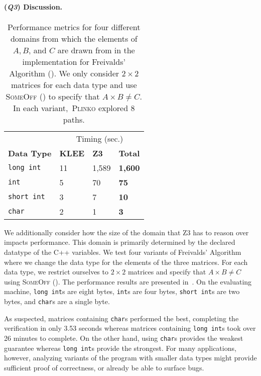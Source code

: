 \documentclass[acmsmall,review,anonymous]{acmart}\settopmatter{printfolios=true,printccs=false,printacmref=false}
\newcommand{\SYSTEM}{\textsc{Plinko}\xspace}
\newcommand{\Q}[1]{(\textit{\textbf{Q#1}})}
\begin{document}
\paragraph*{\Q{3} Discussion.}

\begin{table}
  \centering
  \caption{Performance metrics for four different domains from which the elements of $A,B$, and $C$ are drawn from in the implementation for Freivalds' Algorithm (). We only consider $2 \times 2$ matrices for each data type and use \textsc{SomeOff} () to specify that $A \times B \neq C$. In each variant,~\SYSTEM explored 8 paths.}
  \label{tab:q3}
  \begin{tabular}{@{}llll@{}}
    \toprule
    & \multicolumn{3}{c}{Timing (sec.)}\\ \cmidrule{2-4}
    \textbf{Data Type} & \textbf{KLEE} & \textbf{Z3} & \textbf{Total}\\ \midrule
    \texttt{long int} & 11 & 1,589 & \textbf{1,600}\\
    \texttt{int} & 5 & 70 & \textbf{75}\\
    \texttt{short int} & 3 & 7 & \textbf{10}\\
    \texttt{char} & 2 & 1 & \textbf{3}\\
    \bottomrule
  \end{tabular}
\end{table}
%
We additionally consider how the size of the domain that Z3 has to reason over impacts performance.
%
This domain is primarily determined by the declared datatype of the C++ variables.
% 
We test four variants of Freivalds' Algorithm where we change the data type for the elements of the three matrices.
% 
For each data type, we restrict ourselves to $2 \times 2$ matrices and specify that $A \times B \neq C$ using \textsc{SomeOff} ().
% 
The performance results are presented in~.
% 
On the evaluating machine, \texttt{long int}s are eight bytes, \texttt{int}s are four bytes, \texttt{short int}s are two bytes, and \texttt{char}s are a single byte.


As suspected, matrices containing \texttt{char}s performed the best, completing the verification in only 3.53 seconds whereas matrices containing \texttt{long int}s took over 26 minutes to complete.
% 
On the other hand, using \texttt{char}s provides the weakest guarantee whereas \texttt{long int}s provide the strongest.
% 
For many applications, however, analyzing variants of the program with smaller data types might provide sufficient proof of correctness, or already be able to surface bugs.
\end{document}

